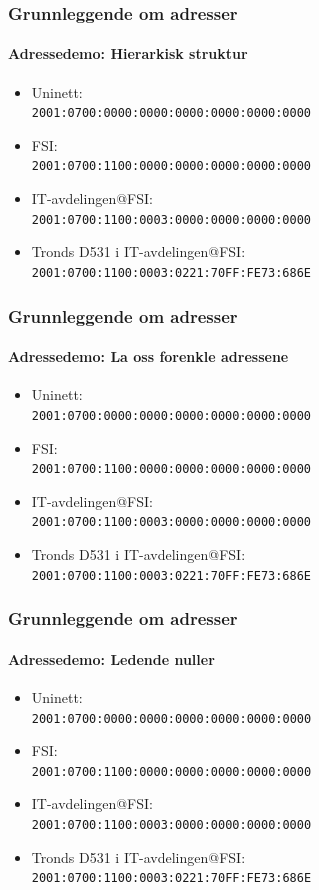 \begin{frame}%
  \frametitle{Grunnleggende om adresser}
  \framesubtitle{Adressedemo: Hierarkisk struktur}
  \begin{itemize}%
  \item Uninett:\\\texttt{\alert{2001:0700}:0000:0000:0000:0000:0000:0000\phantom{/32}}
  \item FSI:\\\texttt{2001:0700:\alert{1100}:0000:0000:0000:0000:0000\phantom{/48}}
  \item IT-avdelingen@FSI:\\\texttt{2001:0700:1100:\alert{0003}:0000:0000:0000:0000\phantom{/64}}
  \item Tronds D531 i IT-avdelingen@FSI:\\\texttt{2001:0700:1100:0003:\alert{0221:70FF:FE73:686E}\phantom{/128}}
  \end{itemize}
\end{frame}

\begin{frame}%
  \frametitle{Grunnleggende om adresser}
  \framesubtitle{Adressedemo: La oss forenkle adressene}
  \begin{itemize}%
  \item Uninett:\\\texttt{2001:0700:0000:0000:0000:0000:0000:0000\phantom{/32}}
  \item FSI:\\\texttt{2001:0700:1100:0000:0000:0000:0000:0000\phantom{/48}}
  \item IT-avdelingen@FSI:\\\texttt{2001:0700:1100:0003:0000:0000:0000:0000\phantom{/64}}
  \item Tronds D531 i IT-avdelingen@FSI:\\\texttt{2001:0700:1100:0003:0221:70FF:FE73:686E\phantom{/128}}
  \end{itemize}
\end{frame}

\begin{frame}%
  \frametitle{Grunnleggende om adresser}
  \framesubtitle{Adressedemo: Ledende nuller}
  \begin{itemize}%
  \item Uninett:\\\texttt{2001:\alert{0}700:\alert{000}0:\alert{000}0:\alert{000}0:\alert{000}0:\alert{000}0:\alert{000}0\phantom{/32}}
  \item FSI:\\\texttt{2001:\alert{0}700:1100:\alert{000}0:\alert{000}0:\alert{000}0:\alert{000}0:\alert{000}0\phantom{/48}}
  \item IT-avdelingen@FSI:\\\texttt{2001:\alert{0}700:1100:\alert{000}3:\alert{000}0:\alert{000}0:\alert{000}0:\alert{000}0\phantom{/64}}
  \item Tronds D531 i IT-avdelingen@FSI:\\\texttt{2001:\alert{0}700:1100:\alert{000}3:\alert{0}221:70FF:FE73:686E\phantom{/128}}
  \end{itemize}
\end{frame}

